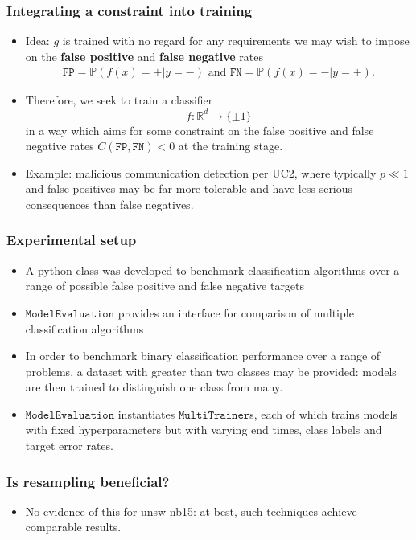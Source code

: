 \documentclass{beamer}
\begin{document}
\begin{frame}
\frametitle{Integrating a constraint into training}
\begin{itemize}
\item
Idea: $g$ is trained with no regard for any requirements we may wish to impose on the \textbf{false positive} and \textbf{false negative} rates
\begin{align*}
\texttt{FP}=\mathbb P(f(x)=+|y=-)\text{ and }\texttt{FN}=\mathbb P(f(x)=-|y=+).
\end{align*}
\item
Therefore, we seek to train a classifier
$$
f:\mathbb R^d\rightarrow \{\pm 1\}
$$
in a way which aims for some constraint on the false positive and false negative rates $C(\texttt{FP},\texttt{FN})<0$ at the training stage.
\item
Example: malicious communication detection per UC2, where typically $p\ll 1$ and false positives may be far more tolerable and have less serious consequences than false negatives.
\end{itemize}
\end{frame}
\begin{frame}
\frametitle{Experimental setup}
\begin{itemize}
\item
A python class was developed to benchmark classification algorithms over a range of possible false positive and false negative targets
\item
$\texttt{ModelEvaluation}$ provides an interface for comparison of multiple classification algorithms
\item 
In order to benchmark binary classification performance over a range of problems, a dataset with greater than two classes may be provided: models are then trained to distinguish one class from many.
\item
$\texttt{ModelEvaluation}$ instantiates $\texttt{MultiTrainer}$s, each of which trains models with fixed hyperparameters but with varying end times, class labels and target error rates.
\end{itemize}
\end{frame}
\begin{frame}
\frametitle{Is resampling beneficial?}
\begin{itemize}
\item
No evidence of this for unsw-nb15: at best, such techniques achieve comparable results.
\end{itemize}
\end{frame}
\end{document}
